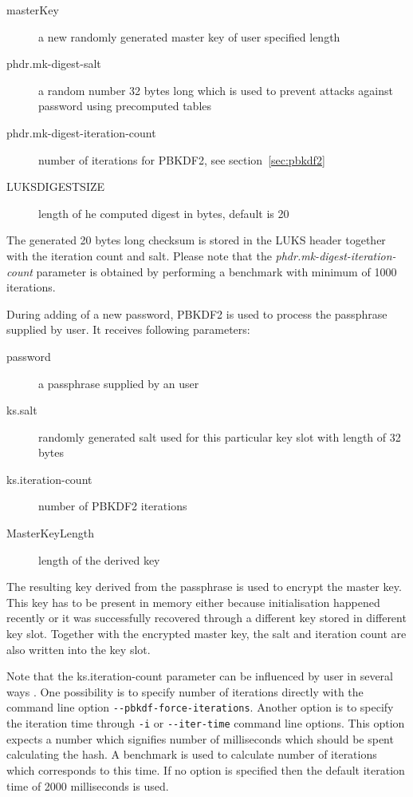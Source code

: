 \documentclass[nolof]{fithesis3}
\begin{document}
\begin{description}
\item[masterKey] a new randomly generated master key of user specified length

\item[phdr.mk-digest-salt] a random number 32 bytes long which is used to prevent attacks against password using precomputed tables \parencite[see][section 5.6.3]{itmc14}

\item[phdr.mk-digest-iteration-count] number of iterations for PBKDF2, see section~\ref{sec:pbkdf2}

\item[LUKS\-DIGEST\-SIZE] length of he computed digest in bytes, default is 20
\end{description}

The generated 20 bytes long checksum is stored in the LUKS header together with the iteration count and salt. Please note that the \emph{phdr.mk-digest-iteration-count} parameter is obtained by performing a benchmark with minimum of 1000 iterations.

During adding of a new password, PBKDF2 is used to process the passphrase supplied by user. It receives following parameters:

\begin{description}
\item[password] a passphrase supplied by an user

\item[ks.salt] randomly generated salt used for this particular key slot with length of 32 bytes

\item[ks.iteration-count] number of PBKDF2 iterations

\item[MasterKeyLength] length of the derived key
\end{description}

The resulting key derived from the passphrase is used to encrypt the master key. This key has to be present in memory either because initialisation happened recently or it was successfully recovered through a different key stored in different key slot. Together with the encrypted master key, the salt and iteration count are also written into the key slot.

Note that the ks.iteration-count parameter can be influenced by user in several ways \parencite{cryptsetupmanual}. One possibility is to specify number of iterations directly with the command line option \verb+--pbkdf-force-iterations+. Another option is to specify the iteration time through \verb+-i+ or \verb+--iter-time+ command line options. This option expects a number which signifies number of milliseconds which should be spent calculating the hash. A benchmark is used to calculate number of iterations which corresponds to this time. If no option is specified then the default iteration time of 2000 milliseconds is used.
\end{document}
